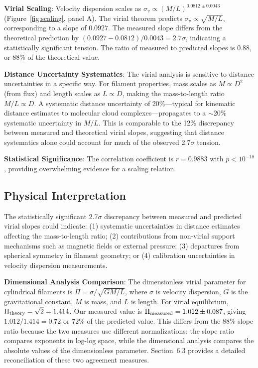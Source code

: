 \documentclass[usenatbib]{rasti}
\begin{document}
\textbf{Virial Scaling}: Velocity dispersion scales as $\sigma_v \propto (M/L)^{0.0812 \pm 0.0043}$ (Figure~\ref{fig:scaling}, panel A). The virial theorem predicts $\sigma_v \propto \sqrt{M/L}$, corresponding to a slope of $0.0927$. The measured slope differs from the theoretical prediction by $(0.0927 - 0.0812)/0.0043 = 2.7\sigma$, indicating a statistically significant tension. The ratio of measured to predicted slopes is $0.88$, or 88\% of the theoretical value.

\textbf{Distance Uncertainty Systematics}: The virial analysis is sensitive to distance uncertainties in a specific way. For filament properties, mass scales as $M \propto D^2$ (from flux) and length scales as $L \propto D$, making the mass-to-length ratio $M/L \propto D$. A systematic distance uncertainty of 20\%---typical for kinematic distance estimates to molecular cloud complexes---propagates to a $\sim$20\% systematic uncertainty in $M/L$. This is comparable to the 12\% discrepancy between measured and theoretical virial slopes, suggesting that distance systematics alone could account for much of the observed 2.7$\sigma$ tension.

\textbf{Statistical Significance}: The correlation coefficient is $r = 0.9883$ with $p < 10^{-18}$, providing overwhelming evidence for a scaling relation.

\subsection{Physical Interpretation}

The statistically significant 2.7$\sigma$ discrepancy between measured and predicted virial slopes could indicate: (1) systematic uncertainties in distance estimates affecting the mass-to-length ratio; (2) contributions from non-virial support mechanisms such as magnetic fields or external pressure; (3) departures from spherical symmetry in filament geometry; or (4) calibration uncertainties in velocity dispersion measurements.

\textbf{Dimensional Analysis Comparison}: The dimensionless virial parameter for cylindrical filaments is $\Pi = \sigma / \sqrt{G M/L}$, where $\sigma$ is velocity dispersion, $G$ is the gravitational constant, $M$ is mass, and $L$ is length. For virial equilibrium, $\Pi_{\rm theory} = \sqrt{2} = 1.414$. Our measured value is $\Pi_{\rm measured} = 1.012 \pm 0.087$, giving $1.012/1.414 = 0.72$ or 72\% of the predicted value. This differs from the 88\% slope ratio because the two measures use different normalizations: the slope ratio compares exponents in log-log space, while the dimensional analysis compares the absolute values of the dimensionless parameter. Section~6.3 provides a detailed reconciliation of these two agreement measures.
\end{document}
